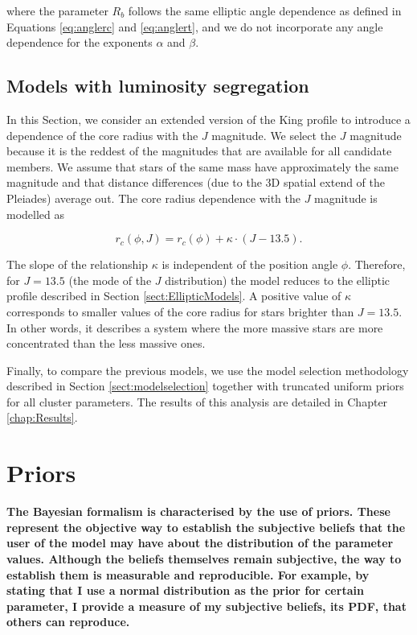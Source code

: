 where the parameter $R_b$ follows the same elliptic angle dependence as defined in Equations \ref{eq:anglerc} and \ref{eq:anglert}, and we do not incorporate any angle dependence for the exponents $\alpha$ and $\beta$.

\subsection{Models with luminosity segregation}
\label{sect:SegregatedModels}
In this Section, we consider an extended version of the King profile to introduce a dependence of the core radius with the $J$ magnitude. We select the $J$ magnitude because it is the reddest of the magnitudes that are available for all candidate members. We assume that stars of the same mass have approximately the same magnitude and that distance differences (due to the 3D spatial extend of the Pleiades) average out. The core radius dependence with the $J$ magnitude is modelled as

\begin{equation}
  r_c(\phi,J) = r_c(\phi)+\kappa\cdot(J-13.5).
\end{equation}

The slope of the relationship $\kappa$ is independent of the position angle $\phi$. Therefore, for $J=13.5$ (the mode of the $J$ distribution) the model reduces to the elliptic profile described in Section \ref{sect:EllipticModels}. A positive value of $\kappa$ corresponds to smaller values of the core radius for stars brighter than $J=13.5$. In other words, it describes a system where the more massive stars are more concentrated than the less massive ones.

Finally, to compare the previous models, we use the model selection methodology described in Section \ref{sect:modelselection} together with truncated uniform priors for all cluster parameters. The results of this analysis are detailed in Chapter \ref{chap:Results}.

\section{Priors}
\label{sect:priors}
\textbf{The Bayesian formalism is characterised by the use of priors. These represent the objective way to establish the subjective beliefs that the user of the model may have about the distribution of the parameter values. Although the beliefs themselves remain subjective, the way to establish them is measurable and reproducible. For example, by stating that I use a normal distribution as the prior for certain parameter, I provide a measure of my subjective beliefs, its PDF, that others can reproduce.}

